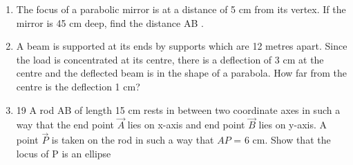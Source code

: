 \begin{enumerate}[label=\arabic*.,ref=\thesubsection.\theenumi]
\item The focus of a parabolic mirror is at a distance of 5 cm from its vertex. If the mirror is 45 cm deep, find the distance AB .
\item A beam is supported at its ends by  supports which are 12 metres apart. Since the load is concentrated at its centre, there is a deflection of 3 cm at the centre and the deflected beam is in the shape of a parabola. How far from the centre is the deflection 1 cm?
\item 19 A rod AB of length 15 cm rests in between two coordinate axes in such a way that the end point $\vec{A}$ lies on x-axis and end point $\vec{B}$ lies on y-axis. A point $\vec{P}$ is taken on the rod in such a way that $AP$ = 6 cm. Show that the locus of P is an ellipse
\end{enumerate}
